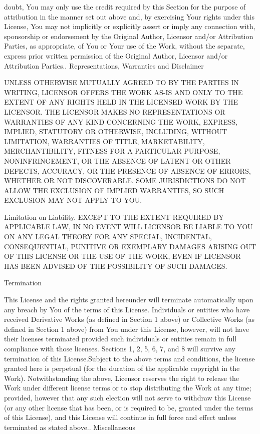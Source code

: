 doubt, You may only use the credit required by this Section for the purpose of attribution in the manner set out above and, by exercising Your rights under this License, You may not implicitly or explicitly assert or imply any connection with, sponsorship or endorsement by the Original Author, Licensor and/or Attribution Parties, as appropriate, of You or Your use of the Work, without the separate, express prior written permission of the Original Author, Licensor and/or Attribution Parties.. Representations, Warranties and Disclaimer

UNLESS OTHERWISE MUTUALLY AGREED TO BY THE PARTIES IN WRITING, LICENSOR OFFERS THE WORK AS-\/\+IS AND ONLY TO THE EXTENT OF ANY RIGHTS HELD IN THE LICENSED WORK BY THE LICENSOR. THE LICENSOR MAKES NO REPRESENTATIONS OR WARRANTIES OF ANY KIND CONCERNING THE WORK, EXPRESS, IMPLIED, STATUTORY OR OTHERWISE, INCLUDING, WITHOUT LIMITATION, WARRANTIES OF TITLE, MARKETABILITY, MERCHANTIBILITY, FITNESS FOR A PARTICULAR PURPOSE, NONINFRINGEMENT, OR THE ABSENCE OF LATENT OR OTHER DEFECTS, ACCURACY, OR THE PRESENCE OF ABSENCE OF ERRORS, WHETHER OR NOT DISCOVERABLE. SOME JURISDICTIONS DO NOT ALLOW THE EXCLUSION OF IMPLIED WARRANTIES, SO SUCH EXCLUSION MAY NOT APPLY TO YOU.


\begin{DoxyEnumerate}
\item Limitation on Liability. EXCEPT TO THE EXTENT REQUIRED BY APPLICABLE LAW, IN NO EVENT WILL LICENSOR BE LIABLE TO YOU ON ANY LEGAL THEORY FOR ANY SPECIAL, INCIDENTAL, CONSEQUENTIAL, PUNITIVE OR EXEMPLARY DAMAGES ARISING OUT OF THIS LICENSE OR THE USE OF THE WORK, EVEN IF LICENSOR HAS BEEN ADVISED OF THE POSSIBILITY OF SUCH DAMAGES.
\item Termination
\end{DoxyEnumerate}

This License and the rights granted hereunder will terminate automatically upon any breach by You of the terms of this License. Individuals or entities who have received Derivative Works (as defined in Section 1 above) or Collective Works (as defined in Section 1 above) from You under this License, however, will not have their licenses terminated provided such individuals or entities remain in full compliance with those licenses. Sections 1, 2, 5, 6, 7, and 8 will survive any termination of this License.\+Subject to the above terms and conditions, the license granted here is perpetual (for the duration of the applicable copyright in the Work). Notwithstanding the above, Licensor reserves the right to release the Work under different license terms or to stop distributing the Work at any time; provided, however that any such election will not serve to withdraw this License (or any other license that has been, or is required to be, granted under the terms of this License), and this License will continue in full force and effect unless terminated as stated above.. Miscellaneous

